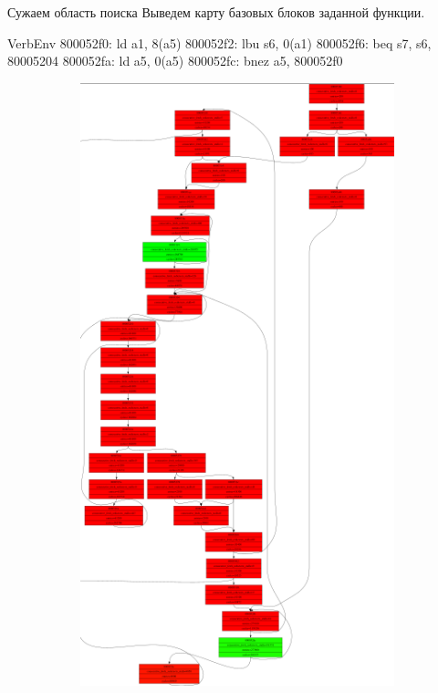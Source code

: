 \documentclass[10pt,aspectratio=169,hyperref={pdftex,unicode},xcolor=dvipsnames]{beamer}
\begin{document}
\begin{frame}[fragile]{ Сужаем область поиска }
    Выведем карту базовых блоков заданной функции.


\begin{SaveVerbatim}[]{VerbEnv}
800052f0:	ld a1, 8(a5)
800052f2:	lbu s6, 0(a1)
800052f6:	beq s7, s6, 80005204
800052fa:	ld a5, 0(a5)
800052fc:	bnez a5, 800052f0
\end{SaveVerbatim}

    \pause
    \begin{figure}
        \begin{subfigure}{0.45\textwidth}
            \centering
            \includegraphics[height=0.7\textheight,keepaspectratio]{./images/stacd_blocks.png}

\end{subfigure}
\end{figure}
\end{frame}
\end{document}

